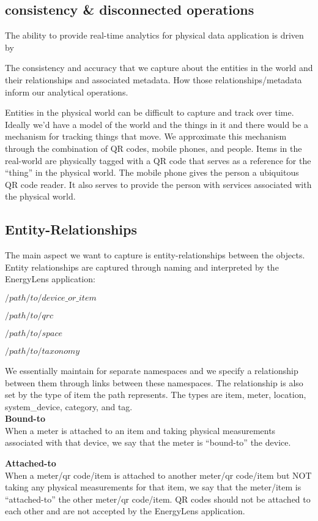 \subsection{consistency \& disconnected operations}

The ability to provide real-time analytics for physical data application is driven by 

The consistency and accuracy that we capture about the entities in the world and their relationships and associated metadata.
How those relationships/metadata inform our analytical operations.

Entities in the physical world can be difficult to capture and track over time.  Ideally we’d have a model of the world and the things in it and there would be a mechanism for tracking things that move.  We approximate this mechanism through the combination of QR codes, mobile phones, and people.  Items in the real-world are physically tagged with a QR code that serves as a reference for the “thing” in the physical world.  The mobile phone gives the person a ubiquitous QR code reader.  It also serves to provide the person with services associated with the physical world.

\subsection{Entity-Relationships}
The main aspect we want to capture is entity-relationships between the objects.  Entity relationships are captured through naming and interpreted by the EnergyLens application:

$/path/to/device\_or\_item$

$/path/to/qrc$

$/path/to/space$

$/path/to/taxonomy$

We essentially maintain for separate namespaces and we specify a relationship between them through links between these namespaces.  The relationship is also set by the type of item the path represents.  The types are item, meter, location, system\_device, category, and tag.\\

{\bf Bound-to}\\
When a meter is attached to an item and taking physical measurements associated with that device, we say that the meter is “bound-to” the device.

{\bf Attached-to}\\
When a meter/qr code/item is attached to another meter/qr code/item but NOT taking any physical measurements for that item, we say that the meter/item is “attached-to” the other meter/qr code/item.  QR codes should not be attached to each other and are not accepted by the EnergyLens application.


